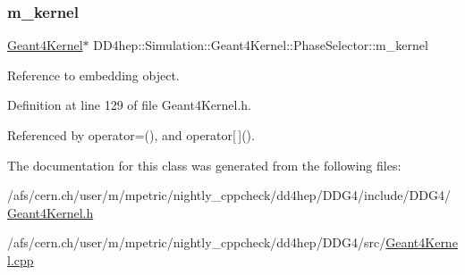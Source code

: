 \subsubsection{\texorpdfstring{m\+\_\+kernel}{m\_kernel}}
{\footnotesize\ttfamily \hyperlink{class_d_d4hep_1_1_simulation_1_1_geant4_kernel}{Geant4\+Kernel}$\ast$ D\+D4hep\+::\+Simulation\+::\+Geant4\+Kernel\+::\+Phase\+Selector\+::m\+\_\+kernel}



Reference to embedding object. 



Definition at line 129 of file Geant4\+Kernel.\+h.



Referenced by operator=(), and operator\mbox{[}$\,$\mbox{]}().



The documentation for this class was generated from the following files\+:\begin{DoxyCompactItemize}
\item 
/afs/cern.\+ch/user/m/mpetric/nightly\+\_\+cppcheck/dd4hep/\+D\+D\+G4/include/\+D\+D\+G4/\hyperlink{_geant4_kernel_8h}{Geant4\+Kernel.\+h}\item 
/afs/cern.\+ch/user/m/mpetric/nightly\+\_\+cppcheck/dd4hep/\+D\+D\+G4/src/\hyperlink{_geant4_kernel_8cpp}{Geant4\+Kernel.\+cpp}\end{DoxyCompactItemize}
